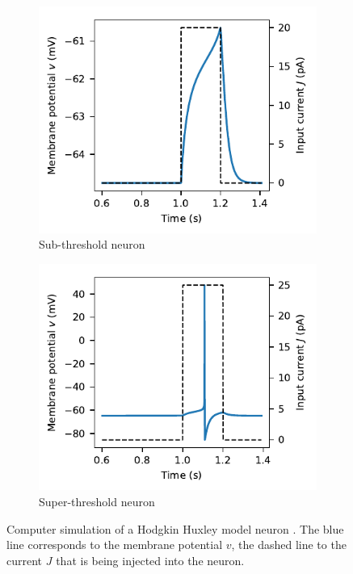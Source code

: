 \documentclass[10pt,letterpaper,oneside]{article}
\begin{document}
\begin{figure}
	\centering%
	\begin{subfigure}{0.5\textwidth}%
		\centering
		\includegraphics{media/hh_neuron_sub_threshold.pdf}%
		\caption{Sub-threshold neuron}%
		\label{fig:hh_neuron_sub_threshold}
	\end{subfigure}%
	\begin{subfigure}{0.5\textwidth}%
		\centering
		\includegraphics{media/hh_neuron_super_threshold.pdf}%
		\caption{Super-threshold neuron}%
		\label{fig:hh_neuron_super_threshold}
	\end{subfigure}%
	\caption{Computer simulation of a Hodgkin Huxley model neuron \cite{hodgkin1952quantitative,traub1991neuronal}. The blue line corresponds to the membrane potential $v$, the dashed line to the current $J$ that is being injected into the neuron.}
\end{figure}
\end{document}
